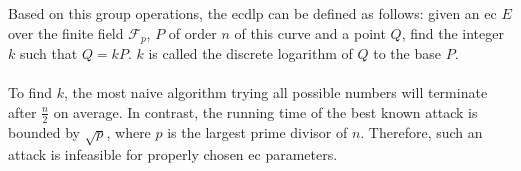 Based on this group operations, the \gls{ecdlp} \cite{ecdlp} can be defined as follows: given an \gls{ec} $E$ over the finite field $\mathcal{F}_p$, $P$ of order $n$ of this curve 
and a point $Q$, find the integer $k$ such that $Q = kP$. $k$ is called the discrete logarithm of $Q$ to the base $P$.
\\
\\
To find $k$, the most naive algorithm trying all possible numbers will terminate after $\frac{n}{2}$ on average. In contrast, the running time of the best known attack is bounded by 
$\sqrt{p}$, where $p$ is the largest prime divisor of $n$. Therefore, such an attack is infeasible for properly chosen \gls{ec} parameters.
